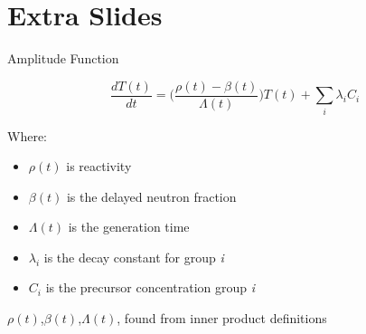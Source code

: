 \section{Extra Slides}

\begin{frame}{Amplitude Function}

{\Large \[\frac{dT(t)}{dt} = \Big(\frac{\rho(t) - \beta(t)}{\Lambda(t)}\Big)T(t) + \sum_{i}\lambda_i C_i  \] }

{Where:}

\begin{itemize}
    \item $\rho(t)$ is reactivity
    \item $\beta(t)$ is the delayed neutron fraction
    \item $\Lambda(t)$ is the generation time
    \item $\lambda_i$ is the decay constant for group \textit{i}
    \item $C_i$ is the precursor concentration group \textit{i}
\end{itemize}

$\rho(t)$,$\beta(t)$,$\Lambda(t)$, found from inner product definitions 

\end{frame}